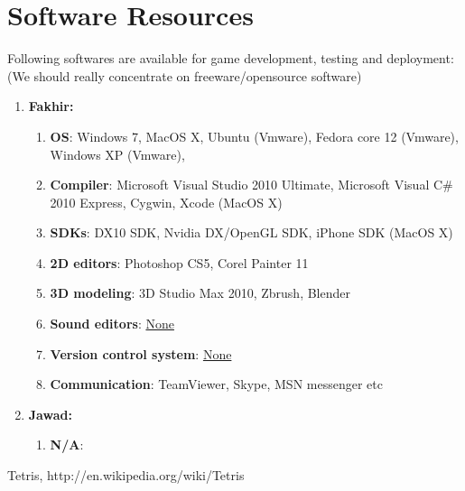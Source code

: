 \documentclass[10pt]{report}
\theoremstyle{definition}
\theoremstyle{remark}
\begin{document}
\section{Software Resources}
Following softwares are available for game development, testing and deployment: (We should really concentrate on freeware/opensource software)
\begin{enumerate}
\item \textbf{Fakhir:}
    \begin{enumerate}
    \item \textbf{OS}: Windows 7, MacOS X, Ubuntu (Vmware), Fedora core 12 (Vmware), Windows XP (Vmware),
    \item \textbf{Compiler}: Microsoft Visual Studio 2010 Ultimate, Microsoft Visual C\# 2010 Express, Cygwin, Xcode (MacOS X)
    \item \textbf{SDKs}: DX10 SDK, Nvidia DX/OpenGL SDK, iPhone SDK (MacOS X)
    \item \textbf{2D editors}: Photoshop CS5, Corel Painter 11
    \item \textbf{3D modeling}: 3D Studio Max 2010, Zbrush, Blender
    \item \textbf{Sound editors}: \underline{None}
    \item \textbf{Version control system}: \underline{None}
    \item \textbf{Communication}: TeamViewer, Skype, MSN messenger etc
    \end{enumerate}

\item \textbf{Jawad:}
    \begin{enumerate}
    \item \textbf{N/A}:
    \end{enumerate}
\end{enumerate}




\begin{thebibliography}{1}

	  Tetris,
	  http://en.wikipedia.org/wiki/Tetris

\end{thebibliography}
\end{document}
